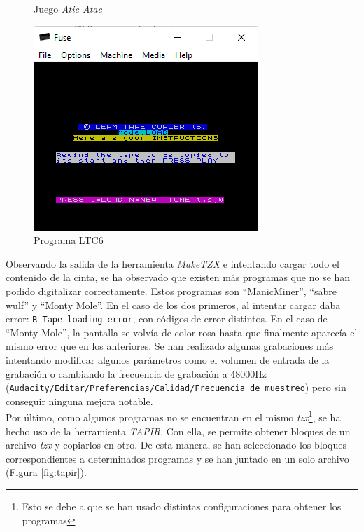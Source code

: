 \documentclass{article}
\begin{document}
\begin{figure}[!htb]
\begin{minipage}{0.32\textwidth}
     \caption{Juego \textit{Atic Atac} }\label{Fig:AticAtac}
   \end{minipage}
  \includegraphics[width=\linewidth]{images/advertencia.png}
  \caption{Programa LTC6}\label{fig:advertencia}
\endminipage
\end{figure}

Observando la salida de la herramienta \textit{MakeTZX} e intentando cargar todo el contenido de la cinta, se ha observado que existen más programas que no se han podido digitalizar correctamente. Estos programas son ``ManicMiner'', ``sabre wulf'' y ``Monty Mole''. En el caso de los dos primeros, al intentar cargar daba error: \texttt{R Tape loading error}, con códigos de error distintos. En el caso de ``Monty Mole'', la pantalla se volvía de color rosa hasta que finalmente aparecía el mismo error que en los anteriores. Se han realizado algunas grabaciones más intentando modificar algunos parámetros como el volumen de entrada de la grabación o cambiando la frecuencia de grabación a 48000Hz (\texttt{Audacity/Editar/Preferencias/Calidad/Frecuencia de muestreo}) pero sin conseguir ninguna mejora notable.\\

Por último, como algunos programas no se encuentran en el mismo \textit{tzx}\footnote{Esto se debe a que se han usado distintas configuraciones para obtener los programas}, se ha hecho uso de la herramienta \textit{TAPIR}. Con ella, se permite obtener bloques de un archivo \textit{tzx} y copiarlos en otro. De esta manera, se han seleccionado los bloques correspondientes a determinados programas y se han juntado en un solo archivo (Figura \ref{fig:tapir}). 
\end{document}
